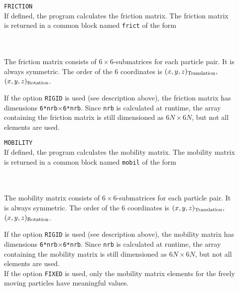 \documentclass[12pt]{article}
\newcommand{\prog}[1]{{\tt #1}}
\newcommand{\wsp}{\hspace*{0.5cm}}
\begin{document}
\begin{description}
\item[]
\prog{FRICTION}\\
If defined, the program calculates the friction matrix. The friction
matrix is returned in a common block named \prog{frict} of the form\\
\wsp\prog{real fr(6*\_NP\_,6*\_NP\_)}\\
\wsp\prog{common /frict/ fr}\\
\begin{sloppy}
The friction matrix consists of $6\times 6$-submatrices for each particle
pair. It is always symmetric. The order of the 6 coordinates is
$(x,y,z)_{\rm Translation},$ $(x,y,z)_{\rm Rotation}$.\\
\end{sloppy}
If the option \prog{RIGID} is used (see description above), the friction
matrix has dimensions \prog{6*nrb}$\times$\prog{6*nrb}. Since
\prog{nrb} is calculated at runtime, the array containing the friction
matrix is still dimensioned as $6N\times 6N$, but not all elements
are used.

\item[]
\prog{MOBILITY}\\
If defined, the program calculates the mobility matrix. The mobility
matrix is returned in a common block named \prog{mobil} of the form\\
\wsp\prog{real mo(6*\_NP\_,6*\_NP\_)}\\
\wsp\prog{common /mobil/ mo}\\
\begin{sloppy}
The mobility matrix consists of $6\times 6$-submatrices for each particle
pair. It is always symmetric. The order of the 6 coordinates is
$(x,y,z)_{\rm Translation},$ $(x,y,z)_{\rm Rotation}$.\\
\end{sloppy}
If the option \prog{RIGID} is used (see description above), the mobility
matrix has dimensions \prog{6*nrb}$\times$\prog{6*nrb}. Since
\prog{nrb} is calculated at runtime, the array containing the mobility
matrix is still dimensioned as $6N\times 6N$, but not all elements
are used.\\
If the option \prog{FIXED} is used, only the mobility matrix elements
for the freely moving particles have meaningful values.


\end{description}
\end{document}
